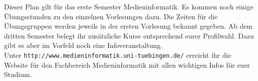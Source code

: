 Dieser Plan gilt für das erste Semester Medieninformatik. 
Es kommen noch einige Übungsstunden zu den einzelnen Vorlesungen dazu. Die Zeiten für die Übungsgruppen werden jeweils in der ersten Vorlesung bekannt gegeben.
Ab dem dritten Semester belegt ihr zusätzliche Kurse entsprechend eurer Profilwahl. Dazu gibt es aber im Vorfeld noch eine Infoveranstaltung.\\
Unter \texttt{http://www.medieninformatik.uni-tuebingen.de/} erreicht ihr die Website für den Fachbereich Medieninformatik mit allen wichtigen Infos für euer Studium. 
